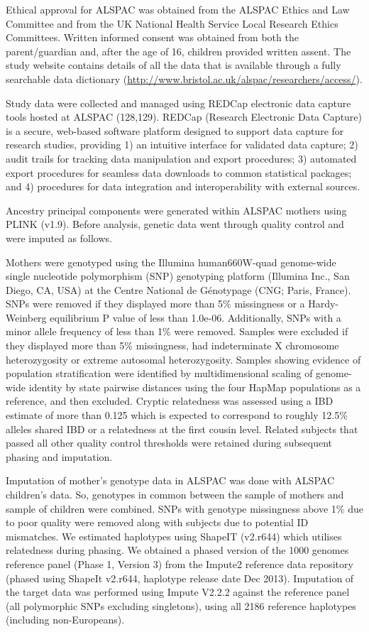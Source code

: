 \documentclass[11pt,oneside]{bristolthesis}
\begin{document}
Ethical approval for ALSPAC was obtained from the ALSPAC Ethics and Law Committee and from the UK National Health Service Local Research Ethics Committees. Written informed consent was obtained from both the parent/guardian and, after the age of 16, children provided written assent. The study website contains details of all the data that is available through a fully searchable data dictionary (\url{http://www.bristol.ac.uk/alspac/researchers/access/}).

Study data were collected and managed using REDCap electronic data capture tools hosted at ALSPAC (128,129). REDCap (Research Electronic Data Capture) is a secure, web-based software platform designed to support data capture for research studies, providing 1) an intuitive interface for validated data capture; 2) audit trails for tracking data manipulation and export procedures; 3) automated export procedures for seamless data downloads to common statistical packages; and 4) procedures for data integration and interoperability with external sources.

Ancestry principal components were generated within ALSPAC mothers using PLINK (v1.9). Before analysis, genetic data went through quality control and were imputed as follows.

Mothers were genotyped using the Illumina human660W-quad genome-wide single nucleotide polymorphism (SNP) genotyping platform (Illumina Inc., San Diego, CA, USA) at the Centre National de Génotypage (CNG; Paris, France). SNPs were removed if they displayed more than 5\% missingness or a Hardy-Weinberg equilibrium P value of less than 1.0e-06. Additionally, SNPs with a minor allele frequency of less than 1\% were removed. Samples were excluded if they displayed more than 5\% missingness, had indeterminate X chromosome heterozygosity or extreme autosomal heterozygosity. Samples showing evidence of population stratification were identified by multidimensional scaling of genome-wide identity by state pairwise distances using the four HapMap populations as a reference, and then excluded. Cryptic relatedness was assessed using a IBD estimate of more than 0.125 which is expected to correspond to roughly 12.5\% alleles shared IBD or a relatedness at the first cousin level. Related subjects that passed all other quality control thresholds were retained during subsequent phasing and imputation.

Imputation of mother's genotype data in ALSPAC was done with ALSPAC children's data. So, genotypes in common between the sample of mothers and sample of children were combined. SNPs with genotype missingness above 1\% due to poor quality were removed along with subjects due to potential ID mismatches. We estimated haplotypes using ShapeIT (v2.r644) which utilises relatedness during phasing. We obtained a phased version of the 1000 genomes reference panel (Phase 1, Version 3) from the Impute2 reference data repository (phased using ShapeIt v2.r644, haplotype release date Dec 2013). Imputation of the target data was performed using Impute V2.2.2 against the reference panel (all polymorphic SNPs excluding singletons), using all 2186 reference haplotypes (including non-Europeans).
\end{document}

